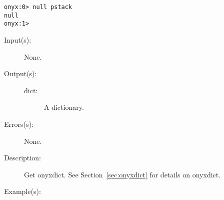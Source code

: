 \begin{description}
\begin{description}
\begin{verbatim}
onyx:0> null pstack
null
onyx:1>
		\end{verbatim}
	\end{description}
\label{systemdict:onyxdict}
\item[{\onyxop{--}{onyxdict}{dict}}: ]
	\begin{description}\item[]
	\item[Input(s): ] None.
	\item[Output(s): ]
		\begin{description}\item[]
		\item[dict: ]
			A dictionary.
		\end{description}
	\item[Errors(s): ] None.
	\item[Description: ]
		Get onyxdict.  See Section~\ref{sec:onyxdict} for details on
		onyxdict.
	\item[Example(s): ]\begin{verbatim}


\end{verbatim}
\end{description}
\end{description}
